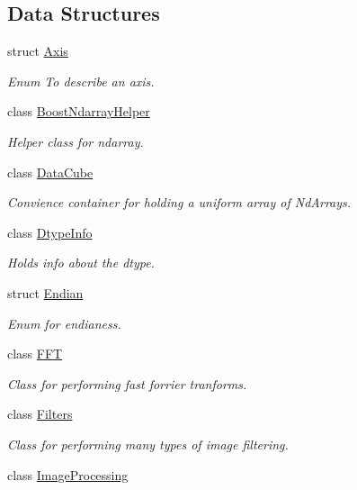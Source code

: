 \subsection*{Data Structures}
\begin{DoxyCompactItemize}
\item 
struct \mbox{\hyperlink{struct_num_c_1_1_axis}{Axis}}
\begin{DoxyCompactList}\small\item\em Enum To describe an axis. \end{DoxyCompactList}\item 
class \mbox{\hyperlink{class_num_c_1_1_boost_ndarray_helper}{Boost\+Ndarray\+Helper}}
\begin{DoxyCompactList}\small\item\em Helper class for ndarray. \end{DoxyCompactList}\item 
class \mbox{\hyperlink{class_num_c_1_1_data_cube}{Data\+Cube}}
\begin{DoxyCompactList}\small\item\em Convience container for holding a uniform array of Nd\+Arrays. \end{DoxyCompactList}\item 
class \mbox{\hyperlink{class_num_c_1_1_dtype_info}{Dtype\+Info}}
\begin{DoxyCompactList}\small\item\em Holds info about the dtype. \end{DoxyCompactList}\item 
struct \mbox{\hyperlink{struct_num_c_1_1_endian}{Endian}}
\begin{DoxyCompactList}\small\item\em Enum for endianess. \end{DoxyCompactList}\item 
class \mbox{\hyperlink{class_num_c_1_1_f_f_t}{F\+FT}}
\begin{DoxyCompactList}\small\item\em Class for performing fast forrier tranforms. \end{DoxyCompactList}\item 
class \mbox{\hyperlink{class_num_c_1_1_filters}{Filters}}
\begin{DoxyCompactList}\small\item\em Class for performing many types of image filtering. \end{DoxyCompactList}\item 
class \mbox{\hyperlink{class_num_c_1_1_image_processing}{Image\+Processing}}

\end{DoxyCompactItemize}
